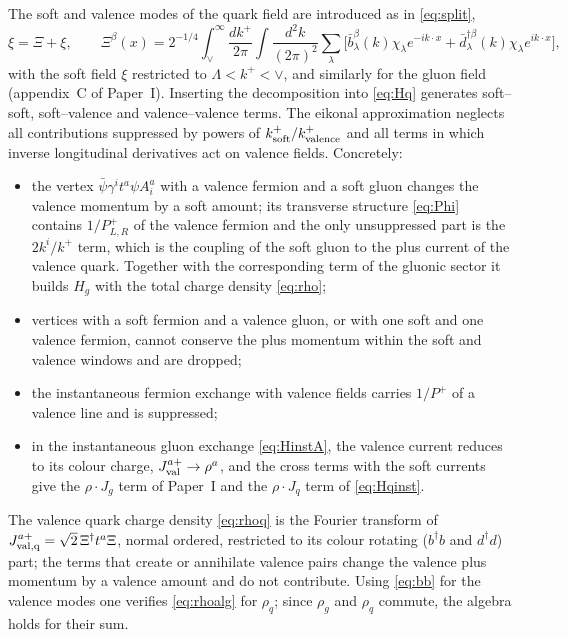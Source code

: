 \documentclass[11pt,a4paper]{article}
\numberwithin{equation}{section}
\newcommand{\dg}{\dagger}
\begin{document}
The soft and valence modes of the quark field are introduced as in \eqref{eq:split},
\begin{equation}
\xi=\Xi+\xi,\qquad
\Xi^{\beta}(x)=2^{-1/4}\!\int_{\vee}^{\infty}\!\frac{dk^{+}}{2\pi}\!\int\!\frac{d^{2}k}{(2\pi)^{2}}
\sum_{\lambda}\Big[\bar b^{\beta}_{\lambda}(k)\chi_{\lambda}e^{-ik\cdot x}+\bar d^{\dg\beta}_{\lambda}(k)\chi_{\lambda}e^{ik\cdot x}\Big],
\end{equation}
with the soft field $\xi$ restricted to $\Lambda<k^{+}<\vee$, and similarly for the gluon field
(appendix~C of Paper~I). Inserting the decomposition into \eqref{eq:Hq} generates soft--soft,
soft--valence and valence--valence terms. The eikonal approximation neglects all contributions
suppressed by powers of $k^{+}_{\rm soft}/k^{+}_{\rm valence}$ and all terms in which inverse longitudinal
derivatives act on valence fields. Concretely:
\begin{itemize}
\item the vertex $\bar\psi\gamma^{i}t^{a}\psi A^{a}_{i}$ with a valence fermion and a soft gluon changes
the valence momentum by a soft amount; its transverse structure \eqref{eq:Phi} contains
$1/P^{+}_{L,R}$ of the valence fermion and the only unsuppressed part is the $2k^{i}/k^{+}$ term,
which is the coupling of the soft gluon to the plus current of the valence quark. Together with the
corresponding term of the gluonic sector it builds $H_{g}$ with the total charge density
\eqref{eq:rho};
\item vertices with a soft fermion and a valence gluon, or with one soft and one valence fermion, cannot
conserve the plus momentum within the soft and valence windows and are dropped;
\item the instantaneous fermion exchange with valence fields carries $1/P^{+}$ of a valence line and is
suppressed;
\item in the instantaneous gluon exchange \eqref{eq:HinstA}, the valence current reduces to its colour
charge, $J^{a+}_{\rm val}\to\rho^{a}$, and the cross terms with the soft currents give the
$\rho\cdot J_{g}$ term of Paper~I and the $\rho\cdot J_{q}$ term of \eqref{eq:Hqinst}.
\end{itemize}
The valence quark charge density \eqref{eq:rhoq} is the Fourier transform of
$J^{a+}_{\rm val,q}=\sqrt2\,\Xi^{\dg}t^{a}\Xi$, normal ordered, restricted to its colour rotating
($b^{\dg}b$ and $d^{\dg}d$) part; the terms that create or annihilate valence pairs change the valence
plus momentum by a valence amount and do not contribute. Using \eqref{eq:bb} for the valence modes
one verifies \eqref{eq:rhoalg} for $\rho_{q}$; since $\rho_{g}$ and $\rho_{q}$ commute, the algebra holds for
their sum.
\end{document}
